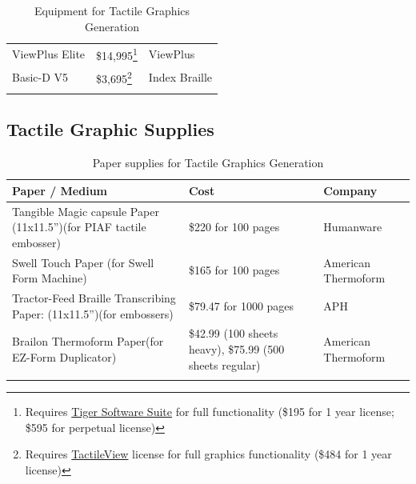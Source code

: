 \documentclass[14pt, letterpaper,twoside]{extreport}
\begin{document}
\begin{longtable}[]{@{}
	>{\raggedright\arraybackslash}p{}
	>{\raggedright\arraybackslash}p{}
	>{\raggedright\arraybackslash}p{}@{}
	}
	ViewPlus Elite                                      & \$14,995\footnote{Requires \href{https://viewplus.com/product/tiger-software-suite8/}{Tiger Software Suite} for full functionality (\$195 for 1 year license; \$595 for perpetual license)} & ViewPlus            \\[1.5em]
	Basic-D V5                                          & \$3,695\footnote{Requires \href{https://tactileview.com/}{TactileView} license for full graphics functionality (\$484 for 1 year license)}                                                  & Index Braille       \\[1.5em]\hline \caption{ Equipment for Tactile Graphics Generation}
\end{longtable}



\hypertarget{tactile-paper}{%
	\subsection*{Tactile Graphic Supplies}\label{tactile-paper}}


\begin{longtable}[]{@{}
	>{\raggedright\arraybackslash}p{}
	>{\raggedright\arraybackslash}p{}
	>{\raggedright\arraybackslash}p{}@{}
	}
	\toprule\noalign{}

	\textbf{Paper / Medium}                                                    & \textbf{Cost}                                            & \textbf{Company}    \\
	\midrule\noalign{}
	\endhead
	\bottomrule\noalign{}
	\endlastfoot
	Tangible Magic capsule Paper (11x11.5'')\break(for PIAF tactile embosser)  & \$220 for 100 pages                                      & Humanware           \\[1.5em]
	Swell Touch Paper \break (for Swell Form Machine)                          & \$165 for 100 pages                                      & American Thermoform \\[1.5em]
	Tractor-Feed Braille Transcribing Paper: (11x11.5'')\break (for embossers) & \$79.47 for 1000 pages                                   & APH                 \\[1.5em]
	Brailon Thermoform Paper\break (for EZ-Form Duplicator)                    & \$42.99 (100 sheets heavy), \$75.99 (500 sheets regular) & American Thermoform \\[1.5em]\hline
	\caption{ Paper supplies for Tactile Graphics Generation }
\end{longtable}
\end{document}
